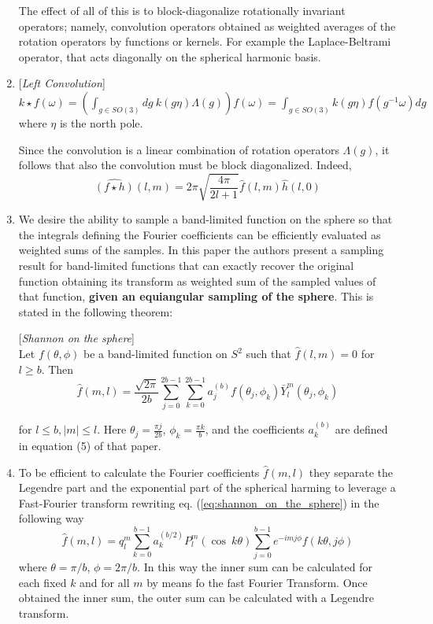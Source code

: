\begin{enumerate}
	The effect of all of this is to block-diagonalize rotationally invariant operators; namely, convolution operators obtained as weighted averages of the rotation operators by functions or kernels. For example the Laplace-Beltrami operator, that acts diagonally on the spherical harmonic basis.
	\item \begin{definition}{[\textit{Left Convolution}]}\\
		$k\star f(\omega) = \left(\int_{g\in SO(3)}dg\ k(g\eta)\Lambda(g)\right)f(\omega) = \int_{g\in SO(3)}k(g\eta)f(g^{-1}\omega)dg$
		where $\eta$ is the north pole. 
	\end{definition}
Since the convolution is a linear combination of rotation operators $\Lambda(g)$, it follows that also the convolution must be block diagonalized. Indeed,
$$\hat {(f \star h)}(l,m) = 2\pi \sqrt{\frac{4\pi}{2l+1}}\hat f(l,m) \hat h(l,0) $$

\item We desire the ability to sample a band-limited function on the sphere so that the integrals defining the Fourier coefficients can be efficiently evaluated as weighted sums of the samples. In this paper the authors present a sampling result for band-limited functions that can exactly recover the original function obtaining its transform as weighted sum of the sampled values of that function, \textbf{given an equiangular sampling of the sphere}. This is stated in the following theorem:
\begin{theorem}{[\textit{Shannon on the sphere}]}\\
	Let $f(\theta, \phi)$ be a band-limited function on $S^2$ such that $\hat f(l,m) = 0$ for $l\geq b$. Then
	\begin{equation}
			\hat f(m,l) = \frac{\sqrt{2\pi}}{2b}\sum_{j=0}^{2b-1}\sum_{k=0}^{2b-1}a_j^{(b)}f(\theta_j, \phi_k)\bar Y_l^m(\theta_j, \phi_k)
			\label{eq:shannon_on_the_sphere}
	\end{equation}

	for $l\leq b, |m|\leq l$. Here $\theta_j = \frac{\pi j}{2b}$, $\phi_k = \frac{\pi k}{b}$, and the coefficients $a_k^{(b)}$ are defined in equation (5) of that paper.
\end{theorem} 

\item To be efficient to calculate the Fourier coefficients $\hat f(m,l)$ they separate the Legendre part and the exponential part  of the spherical harming to leverage a Fast-Fourier transform rewriting eq. (\ref{eq:shannon_on_the_sphere}) in the following way
\begin{equation}
		\hat f(m,l) = q^m_l\sum_{k=0}^{b-1}a_k^{(b/2)}P_l^m(\cos\ k\theta)\sum_{j=0}^{b-1} e^{-imj\phi}f(k\theta, j\phi)
\end{equation}
where $\theta = \pi/b$, $\phi = 2\pi/b$. In this way the inner sum can be calculated for each fixed $k$ and for all $m$ by means fo the fast Fourier Transform. Once obtained the inner sum, the outer sum can be calculated with a Legendre transform.
\end{enumerate}

